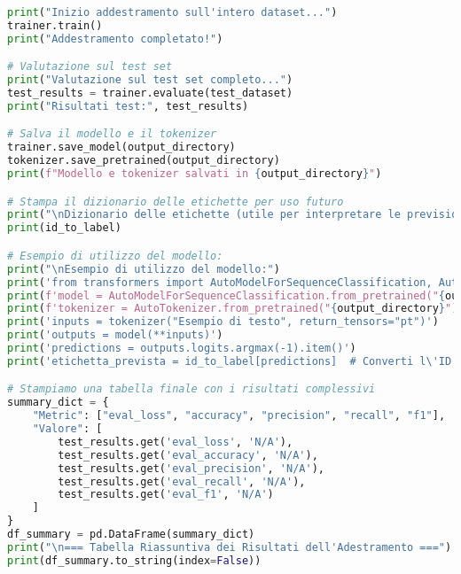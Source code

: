\documentclass[11pt,a4paper]{article}
\begin{document}
\begin{lstlisting}[caption={Codice di Training per il Fine Tuning di BERT}, language=Python]
print("Inizio addestramento sull'intero dataset...")
trainer.train()
print("Addestramento completato!")

# Valutazione sul test set
print("Valutazione sul test set completo...")
test_results = trainer.evaluate(test_dataset)
print("Risultati test:", test_results)

# Salva il modello e il tokenizer
trainer.save_model(output_directory)
tokenizer.save_pretrained(output_directory)
print(f"Modello e tokenizer salvati in {output_directory}")

# Stampa il dizionario delle etichette per uso futuro
print("\nDizionario delle etichette (utile per interpretare le previsioni):")
print(id_to_label)

# Esempio di utilizzo del modello:
print("\nEsempio di utilizzo del modello:")
print('from transformers import AutoModelForSequenceClassification, AutoTokenizer')
print(f'model = AutoModelForSequenceClassification.from_pretrained("{output_directory}")')
print(f'tokenizer = AutoTokenizer.from_pretrained("{output_directory}")')
print('inputs = tokenizer("Esempio di testo", return_tensors="pt")')
print('outputs = model(**inputs)')
print('predictions = outputs.logits.argmax(-1).item()')
print('etichetta_prevista = id_to_label[predictions]  # Converti l\'ID nell\'etichetta originale')

# Stampiamo una tabella finale con i risultati complessivi
summary_dict = {
    "Metric": ["eval_loss", "accuracy", "precision", "recall", "f1"],
    "Valore": [
        test_results.get('eval_loss', 'N/A'),
        test_results.get('eval_accuracy', 'N/A'),
        test_results.get('eval_precision', 'N/A'),
        test_results.get('eval_recall', 'N/A'),
        test_results.get('eval_f1', 'N/A')
    ]
}
df_summary = pd.DataFrame(summary_dict)
print("\n=== Tabella Riassuntiva dei Risultati dell'Adestramento ===")
print(df_summary.to_string(index=False))
\end{lstlisting}
\end{document}
